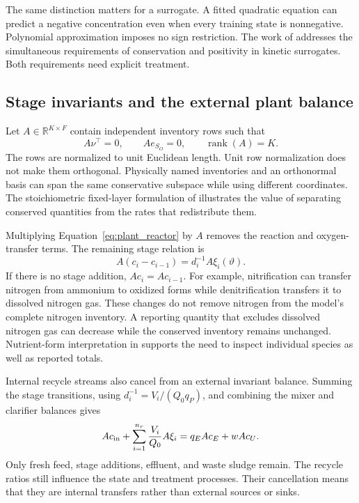 The same distinction matters for a surrogate. A fitted quadratic equation can predict a negative concentration even when every training state is nonnegative. Polynomial approximation imposes no sign restriction. The work of \citet{KircherVotsmeier2025} addresses the simultaneous requirements of conservation and positivity in kinetic surrogates. Both requirements need explicit treatment.

\subsection{Stage invariants and the external plant balance}

Let $A\in\mathbb R^{K\times F}$ contain independent inventory rows such that
\begin{equation}
A\nu^\top=0,\qquad Ae_{S_O}=0,\qquad
\operatorname{rank}(A)=K.
\label{eq:plant_invariant_operator}
\end{equation}
The rows are normalized to unit Euclidean length. Unit row normalization does not make them orthogonal. Physically named inventories and an orthonormal basis can span the same conservative subspace while using different coordinates. The stoichiometric fixed-layer formulation of \citet{SturmWexler2022} illustrates the value of separating conserved quantities from the rates that redistribute them.

Multiplying Equation~\eqref{eq:plant_reactor} by $A$ removes the reaction and oxygen-transfer terms. The remaining stage relation is
\begin{equation}
A(c_i-c_{i-1})=d_i^{-1}A\xi_i(\vartheta).
\label{eq:plant_invariant_transition}
\end{equation}
If there is no stage addition, $Ac_i=Ac_{i-1}$. For example, nitrification can transfer nitrogen from ammonium to oxidized forms while denitrification transfers it to dissolved nitrogen gas. These changes do not remove nitrogen from the model's complete nitrogen inventory. A reporting quantity that excludes dissolved nitrogen gas can decrease while the conserved inventory remains unchanged. Nutrient-form interpretation in \citet{USEPA2009} supports the need to inspect individual species as well as reported totals.

Internal recycle streams also cancel from an external invariant balance. Summing the stage transitions, using $d_i^{-1}=V_i/(Q_0q_P)$, and combining the mixer and clarifier balances gives
\begin{equation}
Ac_{\rm in}+\sum_{i=1}^{n_r}\frac{V_i}{Q_0}A\xi_i
=q_EAc_E+wAc_U.
\label{eq:plant_external_invariant}
\end{equation}
Only fresh feed, stage additions, effluent, and waste sludge remain. The recycle ratios still influence the state and treatment processes. Their cancellation means that they are internal transfers rather than external sources or sinks.


